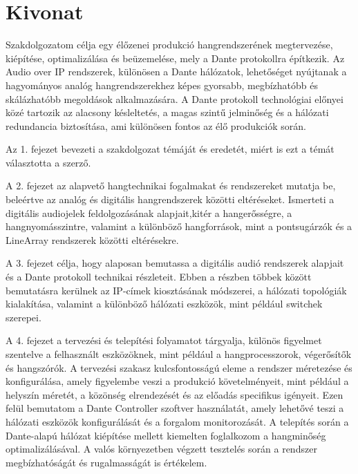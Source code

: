 \setcounter{page}{1}

\selecthungarian

\chapter*{Kivonat}

Szakdolgozatom célja egy élőzenei produkció hangrendszerének megtervezése, 
kiépítése, optimalizálása és beüzemelése, mely a Dante protokollra 
építkezik. Az Audio over IP rendszerek, különösen a Dante hálózatok, 
lehetőséget nyújtanak a hagyományos analóg hangrendszerekhez 
képes gyorsabb, megbízhatóbb és skálázhatóbb megoldások alkalmazására. 
A Dante protokoll technológiai előnyei közé tartozik az alacsony 
késleltetés, a magas szintű jelminőség és a hálózati redundancia 
biztosítása, ami különösen fontos az élő produkciók során.

Az 1. fejezet bevezeti a szakdolgozat témáját és eredetét,
miért is ezt a témát választotta a szerző.

A 2. fejezet az alapvető hangtechnikai fogalmakat és rendszereket 
mutatja be, beleértve az analóg és digitális hangrendszerek 
közötti eltéréseket. Ismerteti a digitális audiojelek 
feldolgozásának alapjait,kitér a hangerősségre, a hangnyomásszintre, valamint a 
különböző hangforrások, mint a pontsugárzók és a LineArray 
rendszerek közötti eltérésekre. 

A 3. fejezet célja, hogy alaposan bemutassa a digitális audió 
rendszerek alapjait és a Dante protokoll technikai részleteit. 
Ebben a részben többek között bemutatásra kerülnek az IP-címek kiosztásának módszerei, 
a hálózati topológiák kialakítása, 
valamint a különböző hálózati eszközök, mint például switchek szerepei.

A 4. fejezet a tervezési és telepítési folyamatot tárgyalja, 
különös figyelmet szentelve a felhasznált eszközöknek, 
mint például a hangprocesszorok, végerősítők és 
hangszórók. A tervezési szakasz kulcsfontosságú eleme a
rendszer méretezése és konfigurálása, amely figyelembe 
veszi a produkció követelményeit, mint például a helyszín 
méretét, a közönség elrendezését és az előadás 
specifikus igényeit. Ezen felül bemutatom a Dante 
Controller szoftver használatát, amely lehetővé teszi a 
hálózati eszközök konfigurálását és a forgalom 
monitorozását. 
A telepítés során a Dante-alapú hálózat  kiépítése mellett kiemelten
foglalkozom a hangminőség optimalizálásával. A valós környezetben 
végzett tesztelés során a rendszer megbízhatóságát és 
rugalmasságát is értékelem.

